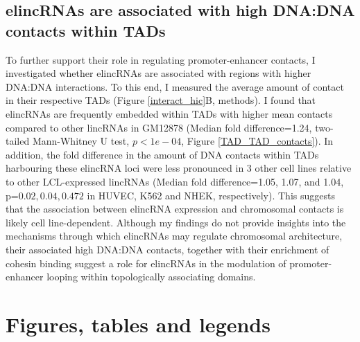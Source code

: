 \documentclass[11pt,a4paper]{report}
\begin{document}
\subsection*{elincRNAs are associated with high DNA:DNA contacts within TADs}

To further support their role in regulating promoter-enhancer contacts, I investigated whether elincRNAs are associated with regions with higher DNA:DNA interactions. To this end, I measured the average amount of contact in their respective TADs (Figure \ref{interact_hic}B, methods). I found that elincRNAs are frequently embedded within TADs with higher mean contacts compared to other lincRNAs in GM12878 (Median fold difference=1.24, two-tailed Mann-Whitney U test, $p<1e-04$, Figure \ref{TAD_TAD_contacts}). In addition, the fold difference in the amount of DNA contacts within TADs harbouring these elincRNA loci were less pronounced in 3 other cell lines relative to other LCL-expressed lincRNAs (Median fold difference=1.05, 1.07, and 1.04, p=$0.02, 0.04, 0.472$ in HUVEC, K562 and NHEK, respectively). This suggests that the association between elincRNA expression and chromosomal contacts is likely cell line-dependent. 
Although my findings do not provide insights into the mechanisms through which elincRNAs may regulate chromosomal architecture, their associated high DNA:DNA contacts, together with their enrichment of cohesin binding suggest a role for elincRNAs in the modulation of promoter-enhancer looping within topologically associating domains.

\section*{Figures, tables and legends}
\end{document}
